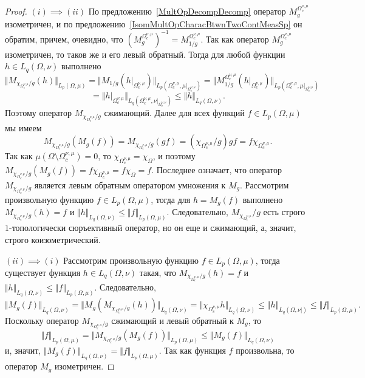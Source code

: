 \begin{proof} $(i) \implies (ii)$ По предложению~\ref{MultOpDecompDecomp}
оператор $M_g^{\Omega_c^{\nu,\mu}}$ изометричен, и по
предложению~\ref{IsomMultOpCharacBtwnTwoContMeasSp} он обратим, причем,
очевидно, что ${(M_g^{\Omega_c^{\nu,\mu}})}^{-1}=M_{1/g}^{\Omega_c^{\nu,\mu}}$.
Так как оператор $M_g^{\Omega_c^{\nu,\mu}}$ изометричен, то таков же и его левый
обратный. Тогда для любой функции $h\in L_q(\Omega,\nu)$ выполнено
$$
\Vert M_{\chi_{\Omega_c^{\nu,\mu}}/g}(h)\Vert_{L_p(\Omega,\mu)}
=\Vert 
    M_{1/g}(h|_{\Omega_c^{\nu,\mu}})
\Vert_{L_p(\Omega_c^{\nu,\mu},\mu|_{\Omega_c^{\nu,\mu}})}
=\Vert 
    M_{1/g}^{\Omega_c^{\nu,\mu}}(h|_{\Omega_c^{\nu,\mu}})
\Vert_{L_p(\Omega_c^{\nu,\mu},\mu|_{\Omega_c^{\nu,\mu}})}
$$
$$
=\Vert 
    h|_{\Omega_c^{\nu,\mu}}
\Vert_{L_q(\Omega_c^{\nu,\mu},\nu|_{\Omega_c^{\nu,\mu}})}
\leq \Vert h \Vert_{L_q(\Omega,\nu)}.
$$
Поэтому оператор $M_{\chi_{\Omega_c^{\nu,\mu}}/g}$ сжимающий. Далее для всех
функций $f\in L_p(\Omega,\mu)$ мы имеем
$$
M_{\chi_{\Omega_c^{\nu,\mu}}/g}(M_g(f))
=M_{\chi_{\Omega_c^{\nu,\mu}}/g}(g  f)
=(\chi_{\Omega_c^{\nu,\mu}}/g)  g  f
=f \chi_{\Omega_c^{\nu,\mu}}.
$$
Так как $\mu(\Omega\setminus\Omega_c^{\nu,\mu})=0$, то
$\chi_{\Omega_c^{\nu,\mu}}=\chi_{\Omega}$, и поэтому
$M_{\chi_{\Omega_c^{\nu,\mu}}/g}(M_g(f))
=f \chi_{\Omega_c^{\nu,\mu}}
=f\chi_{\Omega}=f$. Последнее означает, что оператор
$M_{\chi_{\Omega_c^{\nu,\mu}}/g}$ является левым обратным оператором умножения к
$M_g$. Рассмотрим произвольную функцию $f\in L_p(\Omega,\mu)$, тогда для
$h=M_g(f)$ выполнено $M_{\chi_{\Omega_c^{\nu,\mu}}/g}(h)=f$ и 
$\Vert h\Vert_{L_q(\Omega,\nu)}\leq\Vert f\Vert_{L_p(\Omega,\mu)}$. 
Следовательно, $M_{\chi_{\Omega_c^{\nu,\mu}}}/g$ есть 
строго $1$-топологически сюръективный оператор, но он еще и сжимающий, 
а, значит, строго коизометрический.

$(ii) \implies (i)$ Рассмотрим произвольную функцию $f\in L_p(\Omega,\mu)$,
тогда существует функция $h\in L_q(\Omega,\nu)$ такая, что
$M_{\chi_{\Omega_c^{\nu,\mu}}/g}(h)=f$ и 
$\Vert h\Vert_{L_q(\Omega,\nu)}\leq \Vert f\Vert_{L_p(\Omega,\mu)}$. 
Следовательно,
$$
\Vert M_g(f)\Vert_{L_q(\Omega,\nu)}
=\Vert M_g(M_{\chi_{\Omega_c^{\nu,\mu}}/g}(h))\Vert_{L_q(\Omega,\nu)}
=\Vert \chi_{\Omega_c^{\nu,\mu}}h\Vert_{L_q(\Omega,\nu)}
\leq\Vert h\Vert_{L_q(\Omega,\nu|)}
\leq\Vert f\Vert_{L_p(\Omega,\mu)}.
$$
Поскольку оператор $M_{\chi_{\Omega_c^{\nu,\mu}}/g}$ сжимающий и левый обратный
к $M_g$, то
$$
\Vert f\Vert_{L_p(\Omega,\mu)}
=\Vert M_{\chi_{\Omega_c^{\nu,\mu}}/g}(M_g(f))\Vert_{L_p(\Omega,\mu)}
\leq\Vert M_g(f)\Vert_{L_q(\Omega,\nu)}
$$
и, значит, $\Vert M_g(f)\Vert_{L_q(\Omega,\nu)}=\Vert f\Vert_{L_p(\Omega,\mu)}$.
Так как функция $f$ произвольна, то оператор $M_g$ изометричен.
\end{proof}

